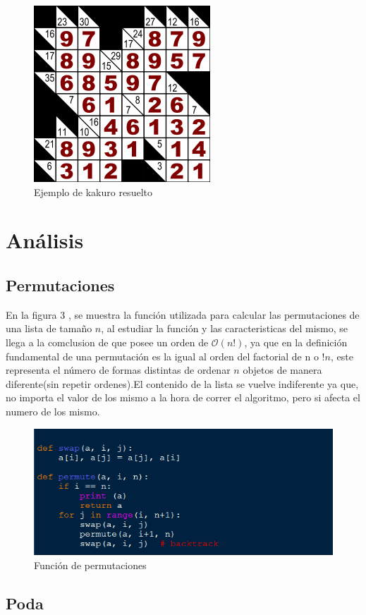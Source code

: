 \documentclass[journal]{IEEEtran}
\begin{document}
\begin{figure}[h] 
        \centering \includegraphics[width=.35\columnwidth]{kakuro_solved.png}
        \caption{
                \label{fig:samplesetup}
                Ejemplo de kakuro resuelto
        }
\end{figure}

\section{Análisis}
\subsection{Permutaciones}
En la figura 3
, se muestra la funci\'{o}n utilizada para calcular las permutaciones de una lista de tama\~{n}o $n$,  al estudiar la funci\'{o}n y las caracteristicas del mismo, se llega a la comclusion de que posee un orden de $\mathcal{O}(n!)$, ya que en la definici\'{o}n fundamental de una permutaci\'{o}n es la igual al orden del factorial de n o $!n$, este representa el número de formas distintas de ordenar $n$ objetos de manera diferente(sin repetir ordenes).El contenido de la lista se vuelve indiferente ya que, no importa el valor de los mismo a la hora de correr el algoritmo, pero si afecta el numero de los mismo.
\begin{figure}[hb] 
	\centering \includegraphics[width=0.9\columnwidth]{permutacion.png}
	\caption{
		\label{fig:samplesetup}
		Función de permutaciones 
	}
\end{figure} 
\subsection{Poda}
\end{document}
